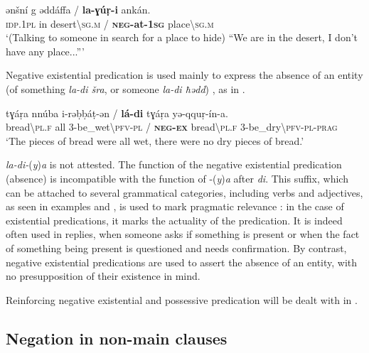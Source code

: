 \documentclass[output=paper,colorlinks,citecolor=brown]{langscibook}
\begin{document}
\ea\label{ex:siw:28} 
    \gll ənšní g ədd\'{a}ffa  / \textbf{la-ɣúṛ-i} ankán. \\
         \textsc{idp.1pl} in desert{\textbackslash}\textsc{sg.m}  / \textbf{\textsc{neg}-at-1\textsc{sg}} place{\textbackslash}\textsc{sg.m} \\
    \glt ‘(Talking to someone in search for a place to hide) “We are in the desert, I don’t have any place...”’%
\z

Negative existential predication is used mainly to express the absence of an entity (of something \textit{la-di šra}, or someone \textit{la-di ħədd}) \citep{Veselinova2013neg.exist}, as in .


\ea\label{ex:siw:29}
    \gll tɣáṛa nnúba i-rəḅḅáṭ-ən / \textbf{lá-di} tɣáṛa yə-qquṛ-ín-a. \\
         bread{\textbackslash}\textsc{pl.f} all 3-be\_wet{\textbackslash}\textsc{pfv-pl} / \textbf{\textsc{neg-ex}} bread{\textbackslash}\textsc{pl.f} 3-be\_dry{\textbackslash}\textsc{pfv-pl-prag}\\
    \glt ‘The pieces of bread were all wet, there were no dry pieces of bread.’
\z

\textit{la-di-}(\textit{y})\textit{a} is not attested. The function of the negative existential predication (absence) is incompatible with the function of -(\textit{y})\textit{a} after \textit{di}. This suffix, which can be attached to several grammatical categories, including verbs and adjectives, as seen in examples  and , is used to mark pragmatic relevance \citep{Schiattarella2019}: in the case of existential predications, it marks the actuality of the predication. It is indeed often used in replies, when someone asks if something is present or when the fact of something being present is questioned and needs confirmation. By contrast, negative existential predications are used to assert the absence of an entity, with no presupposition of their existence in mind. 

Reinforcing negative existential and possessive predication will be dealt with in .


\subsection{Negation in non-main clauses}\label{sec:siw:2.4}
\end{document}

